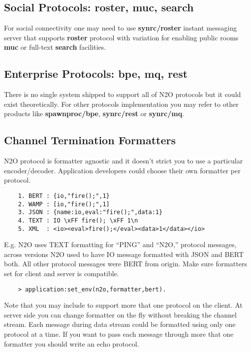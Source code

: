 \subsection*{Social Protocols: {\bf roster}, {\bf muc}, {\bf search}}
For social connectivity one may need to use {\bf synrc/roster} instant messaging server
that supports {\bf roster} protocol  with variation
for enabling public rooms {\bf muc} or full-text {\bf search} facilities.

\subsection*{Enterprise Protocols: {\bf bpe}, {\bf mq}, {\bf rest}}
There is no single system shipped to support all of N2O protocols but it
could exist theoretically. For other protocols implementation you may refer
to other products like {\bf spawnproc/bpe}, {\bf synrc/rest} or {\bf synrc/mq}.

\newpage
\subsection*{Channel Termination Formatters}
N2O protocol is formatter agnostic and it doesn't strict you
to use a particular encoder/decoder.
Application developers could choose their own formatter per protocol.

\vspace{1\baselineskip}
\begin{lstlisting}
    1. BERT : {io,"fire();",1}
    2. WAMP : [io,"fire();",1]
    3. JSON : {name:io,eval:"fire();",data:1}
    4. TEXT : IO \xFF fire(); \xFF 1\n
    5. XML  : <io><eval>fire();</eval><data>1</data></io>
\end{lstlisting}
\vspace{1\baselineskip}

E.g. N2O uses TEXT formatting for ``PING'' and ``N2O,'' protocol messages,
across versions N2O used to have IO message formatted with JSON and BERT both.
All other protocol messages were BERT from origin.
Make sure formatters set for client and server is compatible.

\vspace{1\baselineskip}
\begin{lstlisting}
    > application:set_env(n2o,formatter,bert).
\end{lstlisting}
\vspace{1\baselineskip}

Note that you may include to support more that one protocol on the client.
At server side you can change formatter on the fly without breaking
the channel stream. Each message during data stream could be formatted
using only one protocol at a time. If you want to pass each message
through more that one formatter you should write an echo protocol.

